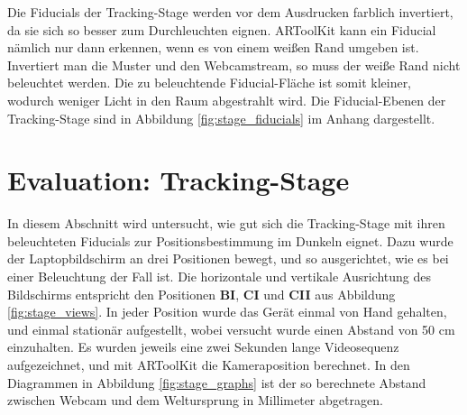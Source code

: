      Die Fiducials der Tracking-Stage werden vor dem Ausdrucken farblich invertiert, da sie sich so besser zum Durchleuchten eignen.
    ARToolKit kann ein Fiducial nämlich nur dann erkennen, wenn es von einem weißen Rand umgeben ist.
    Invertiert man die Muster und den Webcamstream, so muss der weiße Rand nicht beleuchtet werden. 
    Die zu beleuchtende Fiducial-Fläche ist somit kleiner, wodurch weniger Licht in den Raum abgestrahlt wird.
    Die Fiducial-Ebenen der Tracking-Stage sind in Abbildung \ref{fig:stage_fiducials} im Anhang dargestellt.

  
  \section{Evaluation: Tracking-Stage}
    In diesem Abschnitt wird untersucht, wie gut sich die Tracking-Stage mit ihren beleuchteten Fiducials zur Positionsbestimmung im Dunkeln eignet. 
    Dazu wurde der Laptopbildschirm an drei Positionen bewegt, und so ausgerichtet, wie es bei einer Beleuchtung der Fall ist. 
    Die horizontale und vertikale Ausrichtung des Bildschirms entspricht den Positionen \textbf{BI}, \textbf{CI} und \textbf{CII}  aus Abbildung \ref{fig:stage_views}.
    In jeder Position wurde das Gerät einmal von Hand gehalten, und einmal stationär aufgestellt, wobei versucht wurde einen Abstand von 50 cm einzuhalten.
    Es wurden jeweils eine zwei Sekunden lange Videosequenz aufgezeichnet, und mit ARToolKit die Kameraposition berechnet.
    In den Diagrammen in Abbildung \ref{fig:stage_graphs} ist der so berechnete Abstand zwischen Webcam und dem Weltursprung in Millimeter abgetragen.
    
